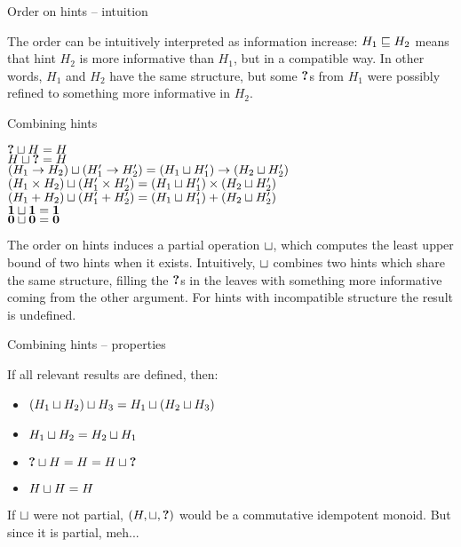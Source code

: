 \documentclass{beamer}
\newcommand{\Fun}[2]{#1 \to #2}
\newcommand{\Prod}[2]{#1 \times #2}
\newcommand{\Sum}[2]{#1 + #2}
\newcommand{\Unit}{\textbf{1}}
\newcommand{\Empty}{\textbf{0}}
\begin{document}
\begin{frame}{Order on hints -- intuition}

The order can be intuitively interpreted as information increase: $H_1 \sqsubseteq H_2$ means that hint $H_2$ is more informative than $H_1$, but in a compatible way. In other words, $H_1$ and $H_2$ have the same structure, but some $\textbf{?}$s from $H_1$ were possibly refined to something more informative in $H_2$.

\end{frame}

\begin{frame}{Combining hints}

\begin{center}
  $\textbf{?} \sqcup H = H$ \\
  $H \sqcup \textbf{?} = H$ \\
  $\combinehints{(\Fun{H_1}{H_2})}{(\Fun{H'_1}{H'_2})} = \Fun{(\combinehints{H_1}{H'_1})}{(\combinehints{H_2}{H'_2})}$ \\
  $\combinehints{(\Prod{H_1}{H_2})}{(\Prod{H'_1}{H'_2})} = \Prod{(\combinehints{H_1}{H'_1})}{(\combinehints{H_2}{H'_2})}$ \\
  $\combinehints{(\Sum{H_1}{H_2})}{(\Sum{H'_1}{H'_2})} = \Sum{(\combinehints{H_1}{H'_1})}{(\combinehints{H_2}{H'_2})}$ \\
  $\combinehints{\Unit}{\Unit} = \Unit$ \\
  $\combinehints{\Empty}{\Empty} = \Empty$
\end{center}

The order on hints induces a partial operation $\sqcup$, which computes the least upper bound of two hints when it exists. Intuitively, $\sqcup$ combines two hints which share the same structure, filling the $\textbf{?}$s in the leaves with something more informative coming from the other argument. For hints with incompatible structure the result is undefined.

\end{frame}

\begin{frame}{Combining hints -- properties}

If all relevant results are defined, then:

\begin{itemize}
  \item $(H_1 \sqcup H_2) \sqcup H_3 = H_1 \sqcup (H_2 \sqcup H_3)$
  \item $H_1 \sqcup H_2 = H_2 \sqcup H_1$
  \item $\textbf{?} \sqcup H = H = H \sqcup \textbf{?}$
  \item $H \sqcup H = H$
\end{itemize}

\vspace{2em}

If $\sqcup$ were not partial, $(H, \sqcup, \textbf{?})$ would be a commutative idempotent monoid. But since it is partial, meh...

\end{frame}
\end{document}
